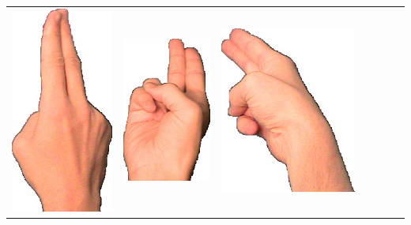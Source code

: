 \documentclass{article}
\begin{document}
\begin{center}
\begin{tabular}{r*{6}{c}}
\includegraphics[scale=0.1]{images/02-03-3.jpg}&
\includegraphics[scale=0.1]{images/02-03-4.jpg}&
\includegraphics[scale=0.1]{images/02-03-5.jpg}&

\end{tabular}
\end{center}
\end{document}
